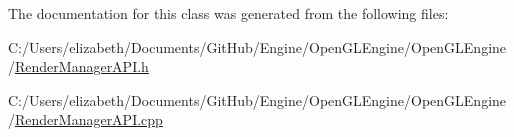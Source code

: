 The documentation for this class was generated from the following files\+:\begin{DoxyCompactItemize}
\item 
C\+:/\+Users/elizabeth/\+Documents/\+Git\+Hub/\+Engine/\+Open\+G\+L\+Engine/\+Open\+G\+L\+Engine/\hyperlink{_render_manager_a_p_i_8h}{Render\+Manager\+A\+P\+I.\+h}\item 
C\+:/\+Users/elizabeth/\+Documents/\+Git\+Hub/\+Engine/\+Open\+G\+L\+Engine/\+Open\+G\+L\+Engine/\hyperlink{_render_manager_a_p_i_8cpp}{Render\+Manager\+A\+P\+I.\+cpp}\end{DoxyCompactItemize}
